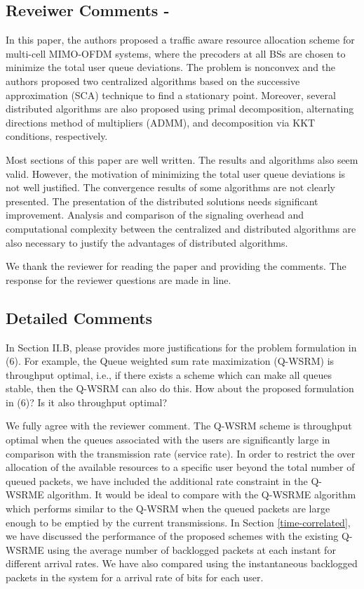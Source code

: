 
\subsection{Reveiwer Comments - }

In this paper, the authors proposed a traffic aware resource allocation scheme for multi-cell MIMO-OFDM systems, where the precoders at all BSs are chosen to minimize the total user queue deviations. The problem is nonconvex and the authors proposed two centralized algorithms based on the successive approximation (SCA) technique to find a stationary point. Moreover, several distributed algorithms are also proposed using primal decomposition, alternating directions method of multipliers (ADMM), and decomposition via KKT conditions, respectively.

Most sections of this paper are well written. The results and algorithms also seem valid. However, the motivation of minimizing the total user queue deviations is not well justified. The convergence results of some algorithms are not clearly presented. The presentation of the distributed solutions needs significant improvement. Analysis and comparison of the signaling overhead and computational complexity between the centralized and distributed algorithms are also necessary to justify the advantages of distributed algorithms.

\resp We thank the reviewer for reading the paper and providing the comments. The response for the reviewer questions are made in line.

\subsection*{Detailed Comments}  
 In Section II.B, please provides more justifications for the problem formulation in (6). For example, the Queue weighted sum rate maximization (Q-WSRM) is throughput optimal, i.e., if there exists a scheme which can make all queues stable, then the Q-WSRM can also do this. How about the proposed formulation in (6)? Is it also throughput optimal? 

\resp We fully agree with the reviewer comment. The Q-WSRM scheme is throughput optimal when the queues associated with the users are significantly large in comparison with the transmission rate (service rate). In order to restrict the over allocation of the available resources to a specific user beyond the total number of queued packets, we have included the additional rate constraint in the Q-WSRME algorithm. It would be ideal to compare with the Q-WSRME algorithm which performs similar to the Q-WSRM when the queued packets are large enough to be emptied by the current transmissions. In Section \ref{time-correlated}, we have discussed the performance of the proposed schemes with the existing \ac{Q-WSRME} using the average number of backlogged packets at each instant for different arrival rates. We have also compared using the instantaneous backlogged packets in the system for a arrival rate of  bits for each user.

